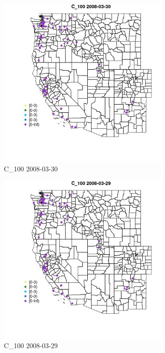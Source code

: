 \begin{figure} 
\centering  
\includegraphics[width=0.77\textwidth]{Code_Outputs/Report_ML_input_PM25_Step4_part_e_de_duplicated_aves_MapObsC_1002008-03-30.jpg} 
\caption{\label{fig:Report_ML_input_PM25_Step4_part_e_de_duplicated_avesMapObsC_1002008-03-30}C_100 2008-03-30} 
\end{figure} 
 

\begin{figure} 
\centering  
\includegraphics[width=0.77\textwidth]{Code_Outputs/Report_ML_input_PM25_Step4_part_e_de_duplicated_aves_MapObsC_1002008-03-29.jpg} 
\caption{\label{fig:Report_ML_input_PM25_Step4_part_e_de_duplicated_avesMapObsC_1002008-03-29}C_100 2008-03-29} 
\end{figure} 
 

